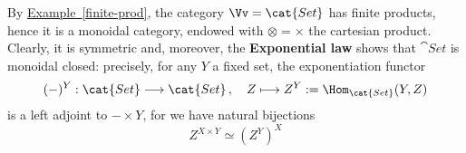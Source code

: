 \begin{ex}
    By \hyperref[finite-prod]{Example~\ref*{finite-prod}},
    the category $\Vv = \cat{Set}$ has finite products, 
    hence it is a monoidal category, endowed with
    $\otimes = \times$ the cartesian product.
    Clearly, it is symmetric and, moreover,
    the \textbf{Exponential law} shows that $\cat{Set}$
    is monoidal closed: precisely, for any $Y$ a fixed set,
    the exponentiation functor
    \begin{equation*}
        (-)^{Y}:\cat{Set} \longrightarrow \cat{Set}\,,
        \quad Z \longmapsto Z^{Y} := \Hom_{\cat{Set}}(Y,Z)
    \end{equation*}
    is a left adjoint to $- \times Y$,
    for we have natural bijections
    \begin{equation*}
        Z^{X \times Y} \simeq \left(Z^{Y}\right)^{X}
    \end{equation*}
\end{ex}

